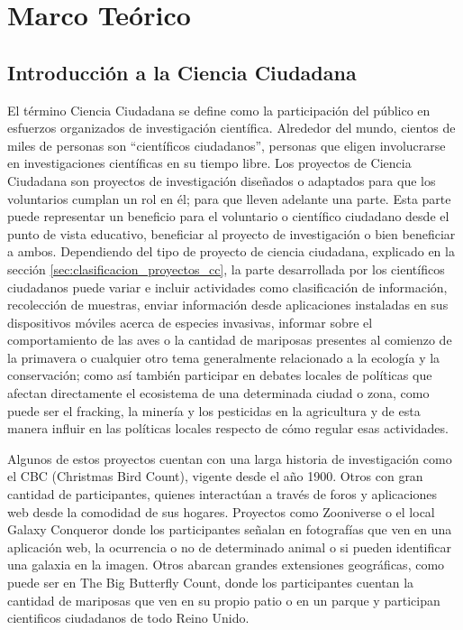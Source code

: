 \chapter{Marco Teórico}
		
	
\section{Introducción a la Ciencia Ciudadana}
    
    El término Ciencia Ciudadana se define como la participación del público en esfuerzos organizados de investigación científica. Alrededor del mundo, cientos de miles de personas son ``científicos ciudadanos'', personas que eligen involucrarse en investigaciones científicas en su tiempo libre. \cite{louv2012citizen} Los proyectos de Ciencia Ciudadana son proyectos de investigación diseñados o adaptados para que los voluntarios cumplan un rol en él; para que lleven adelante una parte. Esta parte puede representar un beneficio para el voluntario o científico ciudadano desde el punto de vista educativo, beneficiar al proyecto de investigación o bien beneficiar a ambos.\cite{silvertown2009new} Dependiendo del tipo de proyecto de ciencia ciudadana, explicado en la sección \ref{sec:clasificacion_proyectos_cc}, la parte desarrollada por los científicos ciudadanos puede variar e incluir actividades como clasificación de información, recolección de muestras, enviar información desde aplicaciones instaladas en sus dispositivos móviles acerca de especies invasivas, informar sobre el comportamiento de las aves o la cantidad de mariposas presentes al comienzo de la primavera o cualquier otro tema generalmente relacionado a la ecología y la conservación; como así también participar en debates locales de políticas que afectan directamente el ecosistema de una determinada ciudad o zona, como puede ser el fracking, la minería y los pesticidas en la agricultura y de esta manera influir en las políticas locales respecto de cómo regular esas actividades.\cite{envCitizenScience}
    
	Algunos de estos proyectos cuentan con una larga historia de investigación como el CBC (Christmas Bird Count), vigente desde el año 1900. Otros con gran cantidad de participantes, quienes interactúan a través de foros y aplicaciones web desde la comodidad de sus hogares. Proyectos como Zooniverse o el local Galaxy Conqueror donde los participantes señalan en fotografías que ven en una aplicación web, la ocurrencia o no de determinado animal o si pueden identificar una galaxia en la imagen. Otros abarcan grandes extensiones geográficas, como puede ser en The Big Butterfly Count, donde los participantes cuentan la cantidad de mariposas que ven en su propio patio o en un parque y participan cientificos ciudadanos de todo Reino Unido. \cite{shirk2012public} 
		
